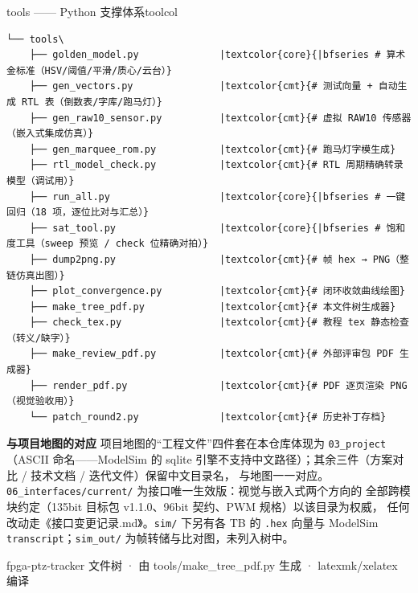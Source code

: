 \documentclass[10pt]{ctexart}
\begin{document}
\begin{sectbox}{tools —— Python 支撑体系}{toolcol}
\begin{Verbatim}[fontsize=\scriptsize, commandchars=\|\{\}]
└── tools\
    ├── golden_model.py              |textcolor{core}{|bfseries # 算术金标准（HSV/阈值/平滑/质心/云台）}
    ├── gen_vectors.py               |textcolor{cmt}{# 测试向量 + 自动生成 RTL 表（倒数表/字库/跑马灯）}
    ├── gen_raw10_sensor.py          |textcolor{cmt}{# 虚拟 RAW10 传感器（嵌入式集成仿真）}
    ├── gen_marquee_rom.py           |textcolor{cmt}{# 跑马灯字模生成}
    ├── rtl_model_check.py           |textcolor{cmt}{# RTL 周期精确转录模型（调试用）}
    ├── run_all.py                   |textcolor{core}{|bfseries # 一键回归（18 项，逐位比对与汇总）}
    ├── sat_tool.py                  |textcolor{core}{|bfseries # 饱和度工具（sweep 预览 / check 位精确对拍）}
    ├── dump2png.py                  |textcolor{cmt}{# 帧 hex → PNG（整链仿真出图）}
    ├── plot_convergence.py          |textcolor{cmt}{# 闭环收敛曲线绘图}
    ├── make_tree_pdf.py             |textcolor{cmt}{# 本文件树生成器}
    ├── check_tex.py                 |textcolor{cmt}{# 教程 tex 静态检查（转义/缺字）}
    ├── make_review_pdf.py           |textcolor{cmt}{# 外部评审包 PDF 生成器}
    ├── render_pdf.py                |textcolor{cmt}{# PDF 逐页渲染 PNG（视觉验收用）}
    └── patch_round2.py              |textcolor{cmt}{# 历史补丁存档}
\end{Verbatim}
\end{sectbox}
\vspace{2.2mm}

\vspace{2.5mm}
\begin{tcolorbox}[colback=boxbg, colframe=linegray, boxrule=0.5pt, arc=1.6mm,
  left=3mm, right=3mm, top=1.8mm, bottom=1.8mm]
{\small\textbf{\color{deep} 与项目地图的对应}\quad
项目地图的“工程文件”四件套在本仓库体现为 \texttt{03\_project}（ASCII 命名——ModelSim
的 sqlite 引擎不支持中文路径）；其余三件（方案对比 / 技术文档 / 迭代文件）保留中文目录名，
与地图一一对应。\texttt{06\_interfaces/current/} 为接口唯一生效版：视觉与嵌入式两个方向的
全部跨模块约定（135bit 目标包 v1.1.0、96bit 契约、PWM 规格）以该目录为权威，
任何改动走《接口变更记录.md》。\texttt{sim/} 下另有各 TB 的 \texttt{.hex} 向量与
ModelSim \texttt{transcript}；\texttt{sim\_out/} 为帧转储与比对图，未列入树中。}
\end{tcolorbox}

\vspace{1.5mm}
{\color{black!45}\scriptsize\hfill fpga-ptz-tracker 文件树 · 由 tools/make\_tree\_pdf.py 生成 · latexmk/xelatex 编译\hfill}
\end{document}
